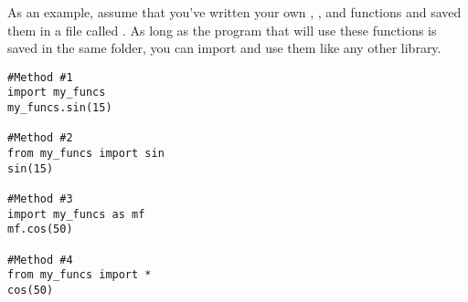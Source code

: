 As an example, assume that you've written your own , , and  functions and saved them in a file called .  As long as the program that will use these functions is saved in the same folder, you can import and use them like any other library.
\begin{Verbatim}
#Method #1
import my_funcs
my_funcs.sin(15)

#Method #2
from my_funcs import sin
sin(15)

#Method #3
import my_funcs as mf
mf.cos(50)

#Method #4
from my_funcs import *
cos(50)
\end{Verbatim}



